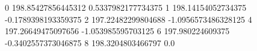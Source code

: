 0 198.85427856445312 0.5337982177734375
1 198.14154052734375 -0.1789398193359375
2 197.22482299804688 -1.0956573486328125
4 197.26649475097656 -1.053985595703125
6 197.980224609375 -0.3402557373046875
8 198.3204803466797 0.0
